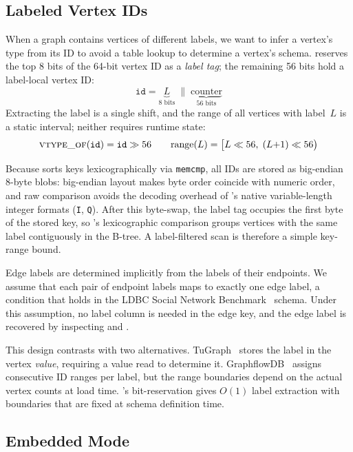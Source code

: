 \subsection{Labeled Vertex IDs}
\label{arch:typed-ids}

When a graph contains vertices of different labels, we want to infer a vertex's type from its ID to avoid a table lookup to determine a vertex's schema.
\project{} reserves the top 8 bits of the 64-bit vertex ID as a \emph{label tag}; the remaining 56 bits hold a label-local vertex ID:
\[
  \texttt{id} = \underbrace{L}_{\text{8 bits}} \;\|\; \underbrace{\text{counter}}_{\text{56 bits}}
\]
Extracting the label is a single shift, and the range of all vertices with label~$L$ is a static interval; neither requires runtime state:
\[
  \textsc{vtype\_of}(\texttt{id}) = \texttt{id} \gg 56
  \qquad
  \text{range}(L) = \bigl[L \ll 56,\; (L{+}1) \ll 56\bigr)
\]

Because \wt{} sorts keys lexicographically via \texttt{memcmp}, all IDs are stored as big-endian 8-byte blobs: big-endian layout makes byte order coincide with numeric order, and raw comparison avoids the decoding overhead of \wt{}'s native variable-length integer formats (\texttt{I}, \texttt{Q}).
After this byte-swap, the label tag occupies the first byte of the stored key, so \wt{}'s lexicographic comparison groups vertices with the same label contiguously in the B-tree.
A label-filtered scan is therefore a simple key-range bound.

Edge labels are determined implicitly from the labels of their endpoints.
We assume that each pair of endpoint labels maps to exactly one edge label, a condition that holds in the LDBC Social Network Benchmark~\cite{capotua2015graphalytics} schema.
Under this assumption, no label column is needed in the edge key, and the edge label is recovered by inspecting  and .

This design contrasts with two alternatives.
TuGraph~\cite{linBuildingHighPerformanceGraph2024} stores the label in the vertex \emph{value}, requiring a value read to determine it.
GraphflowDB~\cite{graphflowdb2021Gupta} assigns consecutive ID ranges per label, but the range boundaries depend on the actual vertex counts at load time.
\project{}'s bit-reservation gives $O(1)$ label extraction with boundaries that are fixed at schema definition time.

\subsection{Embedded Mode}
\label{arch:prop-embedded}

